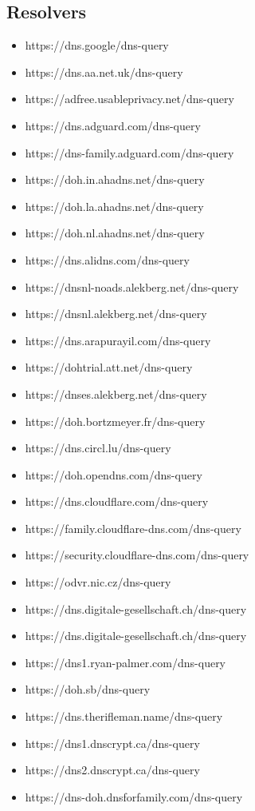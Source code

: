 \subsection{Resolvers}\label{sec:resolvers}
\begin{itemize}
\item https://dns.google/dns-query
\item https://dns.aa.net.uk/dns-query
\item https://adfree.usableprivacy.net/dns-query
\item https://dns.adguard.com/dns-query
\item https://dns-family.adguard.com/dns-query
\item https://doh.in.ahadns.net/dns-query
\item https://doh.la.ahadns.net/dns-query
\item https://doh.nl.ahadns.net/dns-query
\item https://dns.alidns.com/dns-query
\item https://dnsnl-noads.alekberg.net/dns-query
\item https://dnsnl.alekberg.net/dns-query
\item https://dns.arapurayil.com/dns-query
\item https://dohtrial.att.net/dns-query
\item https://dnses.alekberg.net/dns-query
\item https://doh.bortzmeyer.fr/dns-query
\item https://dns.circl.lu/dns-query
\item https://doh.opendns.com/dns-query
\item https://dns.cloudflare.com/dns-query
\item https://family.cloudflare-dns.com/dns-query
\item https://security.cloudflare-dns.com/dns-query
\item https://odvr.nic.cz/dns-query
\item https://dns.digitale-gesellschaft.ch/dns-query
\item https://dns.digitale-gesellschaft.ch/dns-query
\item https://dns1.ryan-palmer.com/dns-query
\item https://doh.sb/dns-query
\item https://dns.therifleman.name/dns-query
\item https://dns1.dnscrypt.ca/dns-query
\item https://dns2.dnscrypt.ca/dns-query
\item https://dns-doh.dnsforfamily.com/dns-query

\end{itemize}
